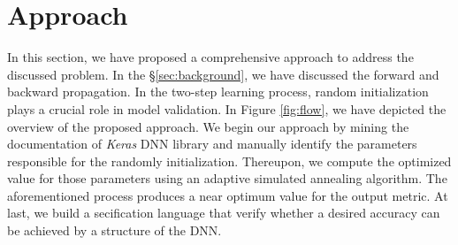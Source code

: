 \section{Approach}
\label{sec:approach}
In this section, we have proposed a comprehensive approach to address the discussed problem. 
In the \S\ref{sec:background}, we have discussed the forward and backward propagation. In the two-step learning process, random initialization plays a crucial role in model validation. 
In Figure \ref{fig:flow}, we have depicted the overview of the proposed approach. We begin our approach by mining the documentation of \emph{Keras} DNN library and manually identify the parameters responsible for the randomly initialization. Thereupon, we compute the optimized value for those parameters using an adaptive simulated annealing algorithm. The aforementioned process produces a near optimum value for the output metric. At last, we build a secification language that verify whether a desired accuracy can be achieved by a structure of the DNN.
